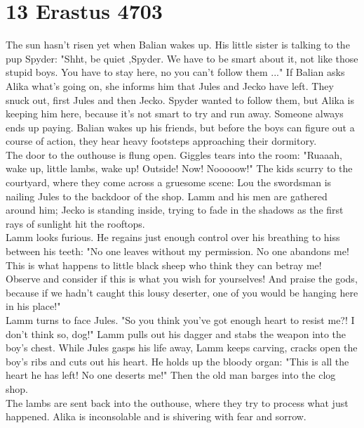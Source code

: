 \section{13 Erastus 4703}

The sun hasn't risen yet when Balian wakes up. His little sister is talking to the pup Spyder: "Shht, be quiet ,Spyder. We have to be smart about it, not like those stupid boys. You have to stay here, no you can't follow them ..." If Balian asks Alika what's going on, she informs him that Jules and Jecko have left. They snuck out, first Jules and then Jecko. Spyder wanted to follow them, but Alika is keeping him here, because it's not smart to try and run away. Someone always ends up paying. Balian wakes up his friends, but before the boys can figure out a course of action, they hear heavy footsteps approaching their dormitory.\\

The door to the outhouse is flung open. Giggles tears into the room: "Ruaaah, wake up, little lambs, wake up! Outside! Now! Nooooow!" The kids scurry to the courtyard, where they come across a gruesome scene: Lou the swordsman is nailing Jules to the backdoor of the shop. Lamm and his men are gathered around him; Jecko is standing inside, trying to fade in the shadows as the first rays of sunlight hit the rooftops.\\

Lamm looks furious. He regains just enough control over his breathing to hiss between his teeth: "No one leaves without my permission. No one abandons me! This is what happens to little black sheep who think they can betray me! Observe and consider if this is what you wish for yourselves! And praise the gods, because if we hadn't caught this lousy deserter, one of you would be hanging here in his place!"\\

Lamm turns to face Jules. "So you think you've got enough heart to resist me?! I don't think so, dog!" Lamm pulls out his dagger and stabs the weapon into the boy's chest. While Jules gasps his life away, Lamm keeps carving, cracks open the boy's ribs and cuts out his heart. He holds up the bloody organ: "This is all the heart he has left! No one deserts me!" Then the old man barges into the clog shop.\\

The lambs are sent back into the outhouse, where they try to process what just happened. Alika is inconsolable and is shivering with fear and sorrow.\\

